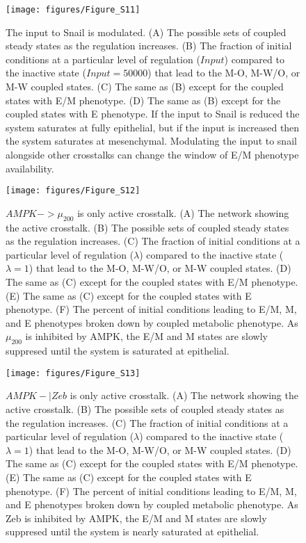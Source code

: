 \documentclass{article}
\begin{document}
\begin{figure}
\texttt{[image: figures/Figure\_S11]}
\caption{The input to Snail is modulated. (A) The possible sets of coupled steady states as the regulation increases. (B) The fraction of initial conditions at a particular level of regulation ($Input$) compared to the inactive state ($Input=50000$) that lead to the M-O, M-W/O, or M-W coupled states. (C) The same as  (B) except for the coupled states with E/M phenotype. (D) The same as (B) except for the coupled states with E phenotype. If the input to Snail is reduced the system saturates at fully epithelial, but if the input is increased then the system saturates at mesenchymal. Modulating the input to snail alongside other crosstalks can change the window of E/M phenotype availability.}
\end{figure}

\begin{figure}
\texttt{[image: figures/Figure\_S12]}
\caption{$AMPK -> \mu_{200}$ is only active crosstalk. (A) The network showing the active crosstalk. (B) The possible sets of coupled steady states as the regulation increases. (C) The fraction of initial conditions at a particular level of regulation ($\lambda$) compared to the inactive state ($\lambda=1$) that lead to the M-O, M-W/O, or M-W coupled states. (D) The same as (C) except for the coupled states with E/M phenotype. (E) The same as (C) except for the coupled states with E phenotype. (F) The percent of initial conditions leading to E/M, M, and E phenotypes broken down by coupled metabolic phenotype. As $\mu_{200}$  is inhibited by AMPK, the E/M and M states are slowly suppresed until the system is saturated at epithelial. }
\end{figure}




\begin{figure}
\texttt{[image: figures/Figure\_S13]}
\caption{$AMPK -| Zeb$ is only active crosstalk. (A) The network showing the active crosstalk. (B) The possible sets of coupled steady states as the regulation increases. (C) The fraction of initial conditions at a particular level of regulation ($\lambda$) compared to the inactive state ($\lambda=1$) that lead to the M-O, M-W/O, or M-W coupled states. (D) The same as (C) except for the coupled states with E/M phenotype. (E) The same as (C) except for the coupled states with E phenotype. (F) The percent of initial conditions leading to E/M, M, and E phenotypes broken down by coupled metabolic phenotype. As Zeb is inhibited by AMPK, the E/M and M states are slowly suppresed until the system is nearly saturated at epithelial. }
\end{figure}
\end{document}
